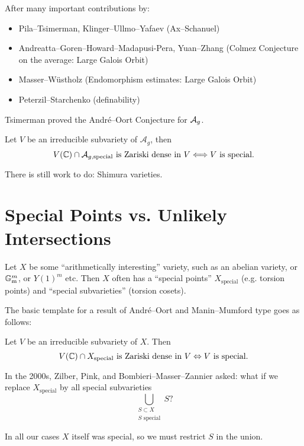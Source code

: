 \documentclass{beamer}
\begin{document}
\begin{frame}
  After many important contributions by:

  \begin{itemize}
  \item  Pila--Tsimerman, Klinger--Ullmo--Yafaev (Ax--Schanuel)
  \item   Andreatta--Goren--Howard--Madapusi-Pera, Yuan--Zhang (Colmez
    Conjecture on the average: Large Galois Orbit)
  \item Masser--Wüstholz (Endomorphism estimates: Large Galois Orbit)
  \item   Peterzil--Starchenko (definability)    
  \end{itemize}

  Tsimerman proved the Andr\'e--Oort Conjecture for ${\mathcal A}_g$. 
  \begin{theorem}[Tsimerman]
    Let $V$ be an irreducible subvariety of $\mathcal{A}_g$, then
    \begin{equation*}
      V({\mathbb{C}})\cap \mathcal{A}_{g,\mathrm{special}} \text{ is Zariski
        dense in $V$}\Longleftrightarrow V\text{ is special.}
    \end{equation*}
  \end{theorem}

  There is still work to do: Shimura varieties.
\end{frame}

\section{Special Points vs. Unlikely Intersections}

\begin{frame}

  Let $X$ be some ``arithmetically interesting'' variety, such as an
  abelian variety, or ${\mathbb{G}}_{\mathrm{m}}^m$, or $Y(1)^m$ etc.
  Then $X$  often has
  a ``special points'' $X_{\mathrm{special}}$ (e.g. torsion points) and ``special
  subvarieties'' (torsion cosets).

  The basic template for a result of Andr\'e--Oort and Manin--Mumford
  type goes as follows:
  
  Let $V$ be an irreducible subvariety of
  $X$. Then
  \begin{equation*}
    V({\mathbb{C}}) \cap X_{\mathrm{special}}\text{ is Zariski dense in
      $V$}\Leftrightarrow \text{$V$ is special}.
  \end{equation*}

  In the 2000s,
  Zilber, Pink, and Bombieri--Masser--Zannier asked: what if we
  replace $X_{\mathrm{special}}$ by all special subvarieties
  \begin{equation*}
    \bigcup_{\substack{S\subset X \\ \text{$S$ special}}} S?
  \end{equation*}

  In all our cases $X$ itself was special, so we must restrict
  $S$ in the union.  
\end{frame}
\end{document}
